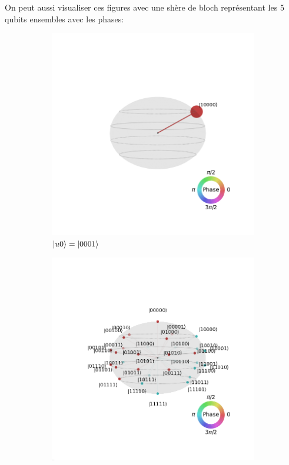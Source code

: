 \documentclass[12pt,a4paper]{article}
\DeclarePairedDelimiter\ket{\lvert}{\rangle}
\begin{document}
On peut aussi visualiser ces figures avec une shère de bloch représentant les 5 qubits ensembles avec les phases:

\begin{figure}[bth]
  \begin{subfigure}[b]{0.3\textwidth}
      \centering
      \includegraphics[width=\textwidth]{images/visualization_constant_2_u0.png}
      \caption{$\ket{u0}=\ket{0001}$}
  \end{subfigure}
  \begin{subfigure}[b]{0.3\textwidth}
      \centering
      \includegraphics[width=\textwidth]{images/visualization_constant_2_u1.png}

\end{subfigure}
\end{figure}
\end{document}
